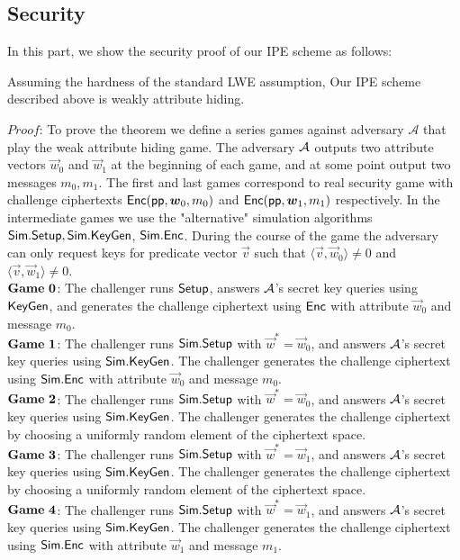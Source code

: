 \subsection{Security}
In this part, we show the security proof of our IPE scheme as follows:
\begin{theorem}
Assuming the hardness of the standard LWE assumption, Our IPE scheme described above is weakly attribute hiding.
\end{theorem}
\noindent $Proof$: To prove the theorem we define a series games against adversary $\mathcal{A}$ that play the weak attribute hiding game. The adversary $\mathcal{A}$ outputs two attribute vectors $\vec{w}_{0}$ and $\vec{w}_{1}$ at the beginning of each game, and at some point output two messages $m_{0},m_{1}$. The first and last games correspond to real security game with challenge ciphertexts $\mathsf{Enc}(\mathsf{pp},\boldsymbol{w}_{0},m_{0})$ and $\mathsf{Enc}(\mathsf{pp},\boldsymbol{w}_{1},m_{1})$ respectively. In the intermediate games we use the "alternative" simulation algorithms $\mathsf{Sim}.\mathsf{Setup},\mathsf{Sim}.\mathsf{KeyGen}$, $\mathsf{Sim}.\mathsf{Enc}$. During the course of the game the adversary can only request keys for predicate vector $\vec{v}$ such that $\langle \vec{v}, \vec{w}_{0} \rangle \neq 0$ and $\langle \vec{v}, \vec{w}_{1} \rangle \neq 0$.\\[0.2cm]
$\mathbf{Game\ 0}$: The challenger runs $\mathsf{Setup}$, answers $\mathcal{A}$'s secret key queries using $\mathsf{KeyGen}$, and generates the challenge ciphertext using $\mathsf{Enc}$ with attribute $\vec{w}_{0}$ and message $m_{0}$.\\[0.2cm]
$\mathbf{Game\ 1}$: The challenger runs $\mathsf{Sim}.\mathsf{Setup}$ with $\vec{w}^{*}=\vec{w}_{0}$, and answers $\mathcal{A}$'s secret key queries using $\mathsf{Sim}.\mathsf{KeyGen}$. The challenger generates the challenge ciphertext using $\mathsf{Sim}.\mathsf{Enc}$ with attribute  $\vec{w}_{0}$ and message $m_{0}$.\\[0.2cm]
$\mathbf{Game\ 2}$: The challenger runs $\mathsf{Sim}.\mathsf{Setup}$ with $\vec{w}^{*}=\vec{w}_{0}$, and answers $\mathcal{A}$'s secret key queries using $\mathsf{Sim}.\mathsf{KeyGen}$. The challenger generates the challenge ciphertext by choosing a uniformly random element of the ciphertext space.\\[0.2cm]
$\mathbf{Game\ 3}$: The challenger runs $\mathsf{Sim}.\mathsf{Setup}$ with $\vec{w}^{*}=\vec{w}_{1}$, and answers $\mathcal{A}$'s secret key queries using $\mathsf{Sim}.\mathsf{KeyGen}$. The challenger generates the challenge ciphertext by choosing a uniformly random element of the ciphertext space.\\[0.2cm]
$\mathbf{Game\ 4}$: The challenger runs $\mathsf{Sim}.\mathsf{Setup}$ with $\vec{w}^{*}=\vec{w}_{1}$, and answers $\mathcal{A}$'s secret key queries using $\mathsf{Sim}.\mathsf{KeyGen}$. The challenger generates the challenge ciphertext using $\mathsf{Sim}.\mathsf{Enc}$ with attribute  $\vec{w}_{1}$ and message $m_{1}$.\\[0.2cm]
